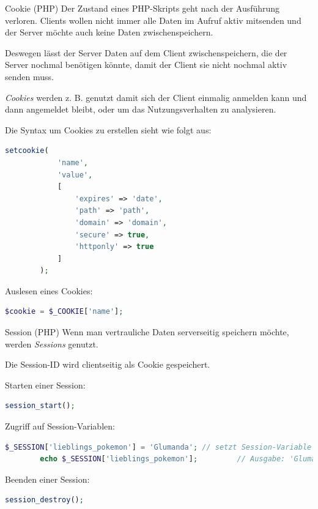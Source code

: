 \begin{defi}{Cookie (PHP)}
    Der Zustand eines PHP-Skripts geht nach der Ausführung verloren.
    Clients wollen nicht immer alle Daten im Aufruf aktiv mitsenden und der Server möchte auch keine Daten zwischenspeichern.

    Deswegen lässt der Server Daten auf dem Client zwischenspeichern, die der Server nochmal benötigen könnte, damit der Client sie nicht nochmal aktiv senden muss.

    \emph{Cookies} werden z. B. genutzt damit sich der Client einmalig anmelden kann und dann angemeldet bleibt, oder um das Nutzungsverhalten zu analysieren.

    Die Syntax um Cookies zu erstellen sieht wie folgt aus:
    \begin{lstlisting}[language=php]    
        setcookie(
            'name',
            'value',
            [
                'expires' => 'date',
                'path' => 'path',
                'domain' => 'domain',
                'secure' => true,
                'httponly' => true
            ]
        );
    \end{lstlisting}

    Auslesen eines Cookies:
    \begin{lstlisting}[language=php]
        $cookie = $_COOKIE['name'];
    \end{lstlisting}
\end{defi}

\begin{defi}{Session (PHP)}
    Wenn man vertrauliche Daten serverseitig speichern möchte, werden \emph{Sessions} genutzt.

    Die Session-ID wird clientseitig als Cookie gespeichert.

    Starten einer Session:
    \begin{lstlisting}[language=php]
        session_start();
    \end{lstlisting}

    Zugriff auf Session-Variablen:
    \begin{lstlisting}[language=php]
        $_SESSION['lieblings_pokemon'] = 'Glumanda'; // setzt Session-Variable 'lieblings_pokemon' auf 'Glumanda'
        echo $_SESSION['lieblings_pokemon'];         // Ausgabe: 'Glumanda'
    \end{lstlisting}

    Beenden einer Session:
    \begin{lstlisting}[language=php]
        session_destroy();
    \end{lstlisting}
\end{defi}